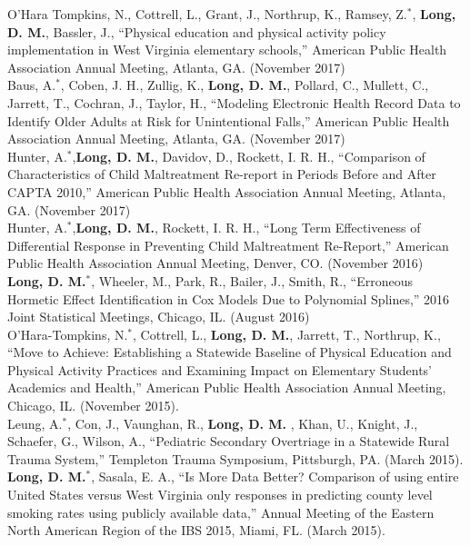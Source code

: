 \documentclass[10pt]{article}
\begin{document}
O'Hara Tompkins, N., Cottrell, L., Grant, J., Northrup, K., Ramsey, Z.$^\ast$, \textbf{Long, D. M.}, Bassler, J., ``Physical education and physical activity policy implementation in West Virginia elementary schools,''  American Public Health Association Annual Meeting, Atlanta, GA. (November 2017)\\

Baus, A.$^\ast$, Coben, J. H., Zullig, K., \textbf{Long, D. M.}, Pollard, C., Mullett, C., Jarrett, T., Cochran, J., Taylor, H., ``Modeling Electronic Health Record Data to Identify Older Adults at Risk for Unintentional Falls,''  American Public Health Association Annual Meeting, Atlanta, GA. (November 2017)\\

Hunter, A.$^\ast$,\textbf{Long, D. M.}, Davidov, D., Rockett, I. R. H., ``Comparison of Characteristics of Child Maltreatment Re-report in Periods Before and After CAPTA 2010,''  American Public Health Association Annual Meeting, Atlanta, GA. (November 2017)\\

Hunter, A.$^\ast$,\textbf{Long, D. M.}, Rockett, I. R. H., ``Long Term Effectiveness of Differential Response in Preventing Child Maltreatment Re-Report,'' American Public Health Association Annual Meeting, Denver, CO. (November 2016)\\

\textbf{Long, D. M.}$^\ast$, Wheeler, M., Park, R., Bailer, J., Smith, R., ``Erroneous Hormetic Effect Identification in Cox Models Due to Polynomial Splines,'' 2016 Joint Statistical Meetings, Chicago, IL. (August 2016)\\

O'Hara-Tompkins, N.$^\ast$, Cottrell, L., \textbf{Long, D. M.}, Jarrett, T., Northrup, K.,  ``Move to Achieve: Establishing a Statewide Baseline of Physical Education and Physical Activity Practices and Examining Impact on Elementary Students' Academics and Health,'' American Public Health Association Annual Meeting, Chicago, IL. (November 2015).\\
 
Leung, A.$^\ast$, Con, J., Vaunghan, R., \textbf{Long, D. M.} , Khan, U., Knight, J., Schaefer, G., Wilson, A.,  ``Pediatric Secondary Overtriage in a Statewide Rural Trauma System,'' Templeton Trauma Symposium, Pittsburgh, PA. (March 2015).\\
 
\textbf{Long, D. M.}$^\ast$, Sasala, E. A.,  ``Is More Data Better? Comparison of using entire United States versus West Virginia only responses in predicting county level smoking rates using publicly available data,'' Annual Meeting of the Eastern North American Region of the IBS 2015, Miami, FL. (March 2015).\\
 
\end{document}
